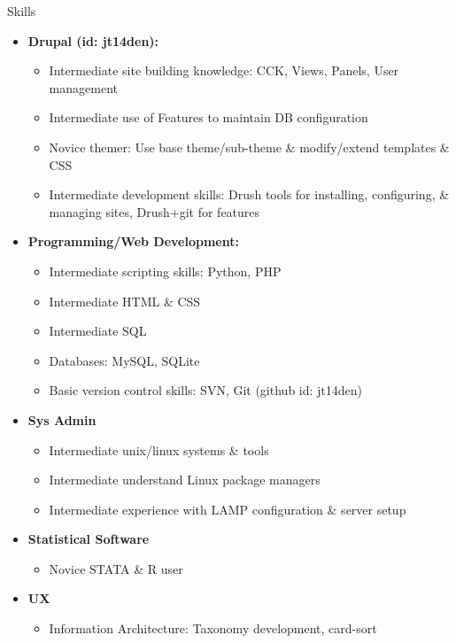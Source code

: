 \documentclass[11pt,oneside]{article}
\newenvironment{ressection}[1]{
	\vspace{4pt}
	{\fontfamily{phv}\selectfont\Large#1}
	\begin{itemize}
	\vspace{3pt}
}{
	\end{itemize}
}
\newcommand{\resitem}[1]{
	\vspace{-4pt}
	\item \begin{flushleft} #1 \end{flushleft}
}
\newcommand{\ressubitem}[1]{
	\vspace{-1pt}
	\item \begin{flushleft} #1 \end{flushleft}
}
\newenvironment{reslist}[1]{
	\resitem{\textbf{#1}}
	\vspace{-5pt}
	\begin{itemize}
}{
	\end{itemize}
}
\begin{document}
\begin{ressection}{Skills}

	\begin{reslist}{Drupal (id: jt14den):}

		\ressubitem{Intermediate site building knowledge: CCK, Views, Panels, User management }

    \ressubitem{Intermediate use of Features to maintain DB configuration}

		\ressubitem{Novice themer: Use base theme/sub-theme \& modify/extend templates \& CSS}

    \ressubitem{Intermediate development skills: Drush tools for installing, configuring, \& managing sites, Drush+git for features}
    
	\end{reslist}

	\begin{reslist}{Programming/Web Development:}

		\ressubitem{Intermediate scripting skills: Python, PHP}

		\ressubitem{Intermediate HTML \& CSS}
		
		\ressubitem{Intermediate SQL}
		
		\ressubitem{Databases: MySQL, SQLite}
		
		\ressubitem{Basic version control skills: SVN, Git (github id: jt14den)}

	\end{reslist}
	
	\begin{reslist}{Sys Admin}
	
	  \ressubitem{Intermediate unix/linux systems \& tools}
	  
    \ressubitem{Intermediate understand Linux package managers}
    
    \ressubitem{Intermediate experience with LAMP configuration \& server setup}
	
	\end{reslist}
	
	\begin{reslist}{Statistical Software}
	
	  \ressubitem{Novice STATA \& R user}
	  
	\end{reslist}
	
  \begin{reslist}{UX}
	
	  \ressubitem{Information Architecture: Taxonomy development, card-sort}
  

\end{reslist}
\end{ressection}
\end{document}
